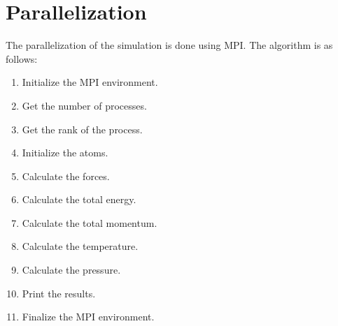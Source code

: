 \section{Parallelization}
The parallelization of the simulation is done using MPI. The algorithm is as follows:
\begin{enumerate}
    \item Initialize the MPI environment.
    \item Get the number of processes.
    \item Get the rank of the process.
    \item Initialize the atoms.
    \item Calculate the forces.
    \item Calculate the total energy.
    \item Calculate the total momentum.
    \item Calculate the temperature.
    \item Calculate the pressure.
    \item Print the results.
    \item Finalize the MPI environment.
\end{enumerate}
